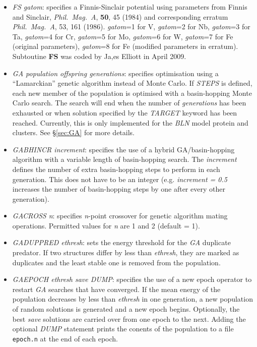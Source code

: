 \documentclass[12pt,a4paper,dvips]{article}
\begin{document}
\begin{itemize}
\item{\it FS gatom}: specifies a Finnis-Sinclair potential using parameters from 
Finnis and Sinclair, {\it Phil.~Mag.~A}, {\bf 50}, 45 (1984) 
and corresponding erratum {\it Phil.~Mag.~A}, 53, 161 (1986). 
{\it gatom}=1 for V, {\it gatom}=2 for Nb, {\it gatom}=3 for Ta, {\it gatom}=4 
for Cr, {\it gatom}=5 for Mo, {\it gatom}=6 for W, {\it gatom}=7 
for Fe (original parameters), {\it gatom}=8 for Fe (modified parameters in erratum). 
Subtoutine {\bf FS} was coded by Ja,es Elliott in April 2009.

\item {\it GA population offspring generations}: specifies optimisation using a
``Lamarckian'' genetic algorithm\cite{Johnston03} instead of Monte Carlo. If
{\it STEPS} is defined, each new member of the population is optimised with a
basin-hopping Monte Carlo search. The search will end when the number
of {\it generations} has been exhausted or when solution specified by
the {\it TARGET} keyword has been reached. Currently, this is only implemented
for the {\it BLN\/} model protein and clusters. See \S \ref{sec:GA} for more
details.

\item {\it GABHINCR increment\/}: specifies the use of a hybrid
GA/basin-hopping algorithm with a variable length of basin-hopping search. The
{\it increment} defines the number of extra basin-hopping steps to perform in
each generation. This does not have to be an integer (e.g. {\it increment =
0.5} increases the number of basin-hopping steps by one after every other
generation).

\item {\it GACROSS n}: specifies {\it n}-point crossover for genetic algorithm
mating operations. Permitted values for {\it n} are 1 and 2 (default = 1).

\item {\it GADUPPRED ethresh\/}: sets the energy threshold for the {\it GA}
duplicate predator. If two structures differ by less than {\it ethresh\/}, they are marked as duplicates and the least stable one is
removed from the population.

\item {\it GAEPOCH ethresh save DUMP\/}: specifies the use of a new epoch
operator to restart {\it GA} searches that have converged. If the mean energy of
the population decreases by less than {\it ethresh} in one generation, a new
population of random solutions is generated and a new epoch begins. Optionally,
the best {\it save} solutions are carried over from one epoch to the next.
Adding the optional {\it DUMP} statement prints the conents of the population to
a file {\tt epoch.n} at the end of each epoch.


\end{itemize}
\end{document}
